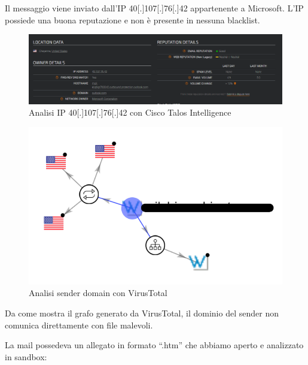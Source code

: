 \newpage

Il messaggio viene inviato dall’IP 40[.]107[.]76[.]42 appartenente a Microsoft.
L’IP possiede una buona reputazione e non è presente in nessuna blacklist.

\begin{figure}[h]
    \begin{center}
        \includegraphics[width=0.98\columnwidth]{images/4_caso_d'uso_img/talosip3.png}
    \end{center}
    \caption{Analisi IP 40[.]107[.]76[.]42 con Cisco Talos Intelligence}
    \label{fig:Analisi IP 40[.]107[.]76[.]42 con Cisco Talos Intelligence}
\end{figure} 

\begin{figure}[h]
    \begin{center}
        \includegraphics[width=0.80\columnwidth]{images/4_caso_d'uso_img/domainVS.png}
    \end{center}
    \caption{Analisi sender domain con VirusTotal}
    \label{fig:Analisi sender domain con VirusTotal}
\end{figure} 

Da come mostra il grafo generato da VirusTotal, il dominio del sender non comunica direttamente con file malevoli.

\newpage

La mail possedeva un allegato in formato “.htm” che abbiamo aperto e analizzato in sandbox:

